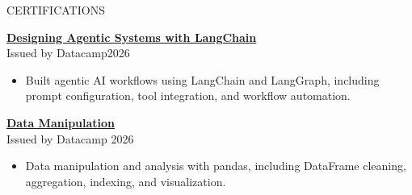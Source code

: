 \documentclass{resume} %
\begin{document}
\begin{rSection}{CERTIFICATIONS}

\begin{minipage}[t]{0.48\textwidth}

\textbf{\href{https://www.datacamp.com/statement-of-accomplishment/course/45f4aa1f7671c6e1629c6504a871af23824d3b40?raw=1}{Designing Agentic Systems with LangChain}} \\
Issued by Datacamp\hfill 2026
\begin{itemize}[leftmargin=1.2em, itemsep=-0.2em, topsep=0.2em]
    \item Built agentic AI workflows using LangChain and LangGraph, including prompt configuration, tool integration, and workflow automation.
\end{itemize}

\end{minipage}
\hfill
\begin{minipage}[t]{0.48\textwidth}

\textbf{ \href{https://www.datacamp.com/statement-of-accomplishment/course/a6266eeac19eda57fb50e50ff53f7913adb0f969?raw=1}{Data Manipulation}}\\
Issued by Datacamp \hfill 2026
\begin{itemize}[leftmargin=1.2em, itemsep=-0.2em, topsep=0.2em]
    \item Data manipulation and analysis with pandas, including DataFrame cleaning, aggregation, indexing, and visualization.
\end{itemize}

\end{minipage}

\end{rSection}
\end{document}
